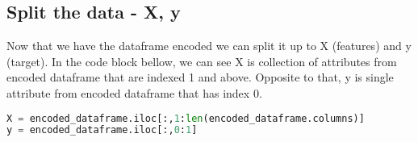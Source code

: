 \subsection{Split the data - X, y}
Now that we have the dataframe encoded we can split it up to X (features) and y (target). In the code block bellow, we can see X is collection of attributes from encoded dataframe that are indexed 1 and above. Opposite to that, y is single attribute from encoded dataframe that has index 0.
\begin{lstlisting}[language=Python, caption=Split the data - X and y]
X = encoded_dataframe.iloc[:,1:len(encoded_dataframe.columns)]
y = encoded_dataframe.iloc[:,0:1]
\end{lstlisting}